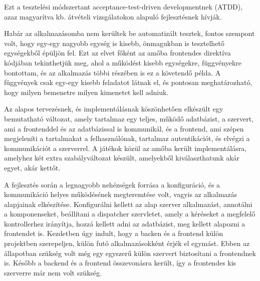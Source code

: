 Ezt a tesztelési módszertant acceptance-test-driven developmentnek (ATDD), azaz magyarítva kb. átvételi vizsgálatokon alapuló fejlesztésnek hívják. \cite{atdd}


Habár az alkalmazásomba nem kerültek be automatizált tesztek, fontos szempont volt, hogy egy-egy nagyobb egység is kisebb, önmagukban is tesztelhető egységekből épüljön fel. Ezt az elvet főként az amőba frontendes direktíva kódjában tekinthetjük meg, ahol a működést kisebb egységekre, függvényekre bontottam, és az alkalmazás többi részében is ez a követendő példa. A függvények csak egy-egy kisebb feladatot látnak el, és pontosan meghatározható, hogy milyen bemenetre milyen kimenetet kell adniuk.


Az alapos tervezésnek, és implementálásnak köszönhetően elkészült egy bemutatható változat, amely tartalmaz egy teljes, működő adatbázist, a szervert, ami a frontenddel és az adatbázissal is kommunikál, és a frontend, ami szépen megjeleníti a tartalmakat a felhasználónak, tartalmaz autentikációt, és elvégzi a kommunikációt a szerverrel.  A játékok közül az amőba került implementálásra, amelyhez két extra szabályváltozat készült, amelyekből kiválaszthatunk akár egyet, akár kettőt.

A fejlesztés során a legnagyobb nehézségek forrása a konfiguráció, és a kommunikáció helyes működésének megteremtése volt, vagyis az alkalmazás alapjainak elkészítése. Konfigurálni kellett az alap szerver alkalmazást, annotálni a komponenseket, beállítani a dispatcher szervletet, amely a kéréseket a megfelelő kontrollerhez irányítja, hozzá kellett adni az adatbázist, meg kellett alapozni a frontendet is. Kezdetben úgy indult, hogy a backen és a frontend külön projektben szerepeljen, külön futó alkalmazásokként érjék el egymást. Ebben az állapotban szükség volt még egy egyszerű külön szervert biztosítani a frontendnek is. Később a backend és a frontend összevonásra került, így a frontendes kis szerverre már nem volt szükség.

